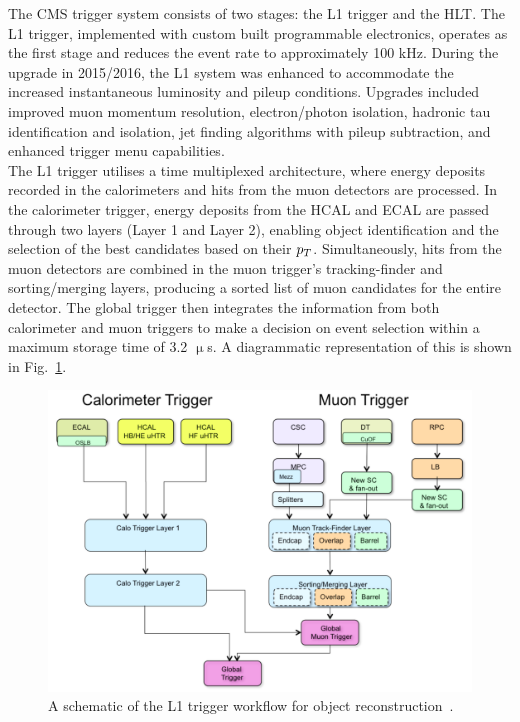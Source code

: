 The \ac{CMS} trigger system consists of two stages: the \ac{L1} trigger and the \ac{HLT}. 
The \ac{L1} trigger, implemented with custom built programmable electronics, operates as the first stage and reduces the event rate to approximately 100 kHz. 
During the upgrade in 2015/2016, the \ac{L1} system was enhanced to accommodate the increased instantaneous luminosity and pileup conditions. 
Upgrades included improved muon momentum resolution, electron/photon isolation, hadronic tau identification and isolation, jet finding algorithms with pileup subtraction, and enhanced trigger menu capabilities. \\

The \ac{L1} trigger utilises a time multiplexed architecture, where energy deposits recorded in the calorimeters and hits from the muon detectors are processed. 
In the calorimeter trigger, energy deposits from the HCAL and ECAL are passed through two layers (Layer 1 and Layer 2), enabling object identification and the selection of the best candidates based on their $p_{T}$. 
Simultaneously, hits from the muon detectors are combined in the muon trigger's tracking-finder and sorting/merging layers, producing a sorted list of muon candidates for the entire detector. 
The global trigger then integrates the information from both calorimeter and muon triggers to make a decision on event selection within a maximum storage time of 3.2 $\upmu$s.
A diagrammatic representation of this is shown in Fig.~\ref{fig:trigger}. \\

\begin{figure}[!hbtp]
    \centering
    \includegraphics[width=\textwidth]{Figures/trigger.png}
    \caption{A schematic of the L1 trigger workflow for object reconstruction~\cite{Tapper:2013yva}.}
    \label{fig:trigger}
\end{figure}

